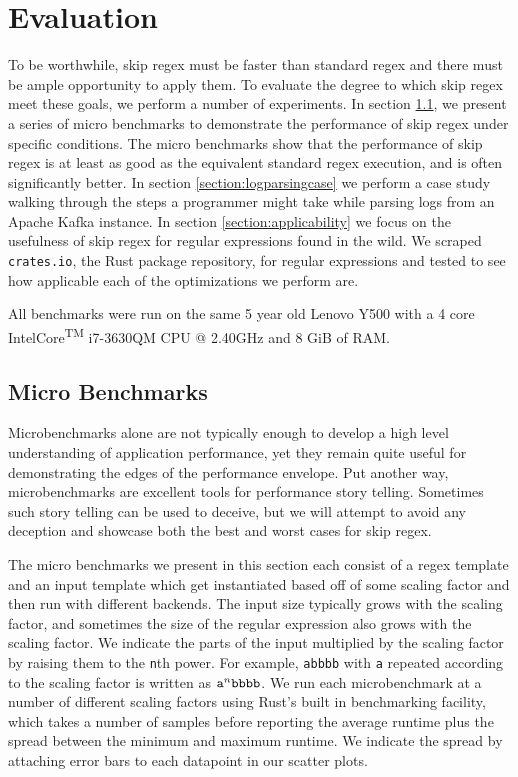 \chapter{Evaluation}
\label{chapter:evaluation}

To be worthwhile, skip regex must be faster than standard
regex and there must be ample opportunity to apply them. To evaluate
the degree to which skip regex meet these goals, we perform a number
of experiments. In section \ref{section:microbenchmarks}, we present a
series of micro benchmarks to demonstrate
the performance of skip regex under specific conditions. The micro
benchmarks show that the performance of skip regex is
at least as good as the equivalent standard regex execution, and 
is often significantly better.
In section \ref{section:logparsingcase} we perform a case study walking
through the steps a programmer might take while parsing logs from
an Apache Kafka instance.
In section \ref{section:applicability} we focus on the usefulness of
skip regex for regular expressions found in the wild. We scraped
\verb'crates.io', the Rust package repository,
for regular expressions and tested to see how applicable each of the 
optimizations we perform are. 

All benchmarks were run on the same 5 year old Lenovo Y500 with a 4 core
Intel\textregistered Core\textsuperscript{TM} i7-3630QM CPU @
2.40GHz and 8 GiB of RAM.

\section{Micro Benchmarks}
\label{section:microbenchmarks}

Microbenchmarks alone are not typically enough to develop a high
level understanding of application performance, yet they remain
quite useful for demonstrating the edges of the performance envelope.
Put another way, microbenchmarks are excellent tools for performance story
telling. Sometimes such story telling can be used to deceive,
but we will attempt to avoid any deception and showcase both the
best and worst cases for skip regex.

The micro benchmarks we present in this section each consist of
a regex template and an input template which get instantiated
based off of some scaling factor and then run with different
backends. The input size typically grows with the scaling factor,
and sometimes the size of the regular expression also
grows with the scaling factor. We indicate the parts of the
input multiplied by the scaling factor by raising them
to the \verb'n'th power. For example, \verb'abbbb' with \verb'a'
repeated according to the scaling factor is written as
${\tt a}^n{\tt bbbb}$. We run each microbenchmark at a
number of different scaling factors using Rust's built in
benchmarking facility, which takes a number of samples before
reporting the average runtime plus the spread between the minimum
and maximum runtime. We indicate the spread by attaching error bars to
each datapoint in our scatter plots.

